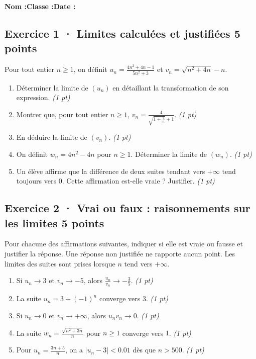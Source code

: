 \smallskip\textbf{Nom :}\enspace\dotfill\quad\textbf{Classe :}\enspace\dotfill\quad\textbf{Date :}\enspace\dotfill

\subsection*{Exercice 1 · Limites calculées et justifiées \hfill 5 points}Pour tout entier $n\ge1$, on définit $u_n=\frac{4n^2+4n-1}{5n^2+3}$ et $v_n=\sqrt{n^2+4n}-n$.

\begin{enumerate}

\item Déterminer la limite de $(u_n)$ en détaillant la transformation de son expression. \hfill\textit{(1 pt)}

\item Montrer que, pour tout entier $n\ge1$, $v_n=\frac{4}{\sqrt{1+\frac{4}n}+1}$. \hfill\textit{(1 pt)}

\item En déduire la limite de $(v_n)$. \hfill\textit{(1 pt)}

\item On définit $w_n=4n^2-4n$ pour $n\ge1$. Déterminer la limite de $(w_n)$. \hfill\textit{(1 pt)}

\item Un élève affirme que la différence de deux suites tendant vers $+\infty$ tend toujours vers $0$. Cette affirmation est-elle vraie ? Justifier. \hfill\textit{(1 pt)}

\end{enumerate}

\subsection*{Exercice 2 · Vrai ou faux : raisonnements sur les limites \hfill 5 points}Pour chacune des affirmations suivantes, indiquer si elle est vraie ou fausse et justifier la réponse. Une réponse non justifiée ne rapporte aucun point. Les limites des suites sont prises lorsque $n$ tend vers $+\infty$.

\begin{enumerate}

\item Si $u_n\to 3$ et $v_n\to-5$, alors $\frac{u_n}{v_n}\to-\frac{3}{5}$. \hfill\textit{(1 pt)}

\item La suite $u_n=3+(-1)^n$ converge vers $3$. \hfill\textit{(1 pt)}

\item Si $u_n\to0$ et $v_n\to+\infty$, alors $u_nv_n\to0$. \hfill\textit{(1 pt)}

\item La suite $w_n=\frac{\sqrt{n^2+3n}}{n}$ pour $n\ge1$ converge vers $1$. \hfill\textit{(1 pt)}

\item Pour $u_n=\frac{3n+5}{n}$, on a $|u_n-3|<\num{0,01}$ dès que $n> 500$. \hfill\textit{(1 pt)}

\end{enumerate}

